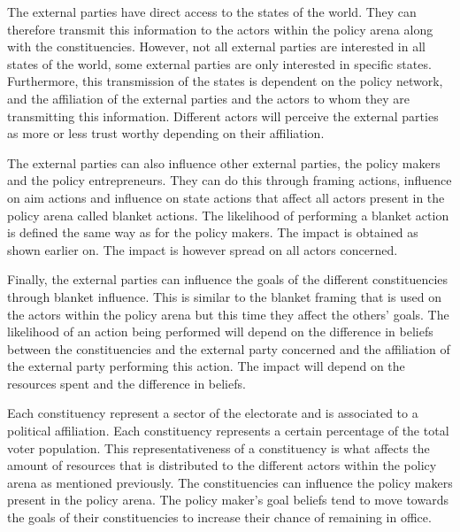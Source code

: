 The external parties have direct access to the states of the world. They can therefore transmit this information to the actors within the policy arena along with the constituencies. However, not all external parties are interested in all states of the world, some external parties are only interested in specific states. Furthermore, this transmission of the states is dependent on the policy network, and the affiliation of the external parties and the actors to whom they are transmitting this information. Different actors will perceive the external parties as more or less trust worthy depending on their affiliation.

The external parties can also influence other external parties, the policy makers and the policy entrepreneurs. They can do this through framing actions, influence on aim actions and influence on state actions that affect all actors present in the policy arena called blanket actions. The likelihood of performing a blanket action is defined the same way as for the policy makers. The impact is  obtained as shown earlier on. The impact is however spread on all actors concerned. 

Finally, the external parties can influence the goals of the different constituencies through blanket influence. This is similar to the blanket framing that is used on the actors within the policy arena but this time they affect the others' goals. The likelihood of an action being performed will depend on the difference in beliefs between the constituencies and the external party concerned and the affiliation of the external party performing this action. The impact will depend on the resources spent and the difference in beliefs.

Each constituency represent a sector of the electorate and is associated to a political affiliation. Each constituency represents a certain percentage of the total voter population. This representativeness of a constituency is what affects the amount of resources that is distributed to the different actors within the policy arena as mentioned previously. The constituencies can influence the policy makers present in the policy arena. The policy maker’s goal beliefs tend to move towards the goals of their constituencies to increase their chance of remaining in office.

